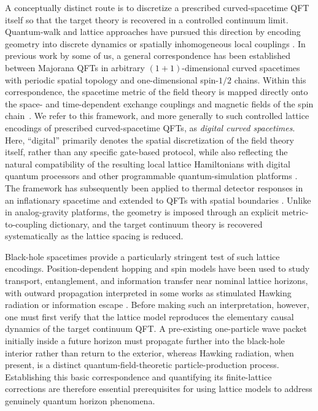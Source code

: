 \documentclass[reprint,amsmath,amssymb,aps,prb,showkeys,superscriptaddress]{revtex4-2}
\begin{document}
A conceptually distinct route is to discretize a prescribed curved-spacetime QFT itself so that the target theory is recovered in a controlled continuum limit. Quantum-walk and lattice approaches have pursued this direction by encoding geometry into discrete dynamics or spatially inhomogeneous local couplings \cite{DiMolfetta2013,Yang2020,LewisVidal2020}. In previous work by some of us, a general correspondence has been established between Majorana QFTs in arbitrary $(1+1)$-dimensional curved spacetimes with periodic spatial topology and one-dimensional spin-$1/2$ chains. Within this correspondence, the spacetime metric of the field theory is mapped directly onto the space- and time-dependent exchange couplings and magnetic fields of the spin chain~\cite{Kinoshita2025}. We refer to this framework, and more generally to such controlled lattice encodings of prescribed curved-spacetime QFTs, as \emph{digital curved spacetimes}. Here, ``digital'' primarily denotes the spatial discretization of the field theory itself, rather than any specific gate-based protocol, while also reflecting the natural compatibility of the resulting local lattice Hamiltonians with digital quantum processors and other programmable quantum-simulation platforms \cite{Altman2021}. The framework has subsequently been applied to thermal detector responses in an inflationary spacetime and extended to QFTs with spatial boundaries \cite{KinoshitaInflation2025,KinoshitaBoundary2026}. Unlike in analog-gravity platforms, the geometry is imposed through an explicit metric-to-coupling dictionary, and the target continuum theory is recovered systematically as the lattice spacing is reduced.

Black-hole spacetimes provide a particularly stringent test of such lattice encodings. Position-dependent hopping and spin models have been used to study transport, entanglement, and information transfer near nominal lattice horizons, with outward propagation interpreted in some works as stimulated Hawking radiation or information escape \cite{Yang2020,Shi2023,Benhemou2023,Liu2026}. Before making such an interpretation, however, one must first verify that the lattice model reproduces the elementary causal dynamics of the target continuum QFT. A pre-existing one-particle wave packet initially inside a future horizon must propagate further into the black-hole interior rather than return to the exterior, whereas Hawking radiation, when present, is a distinct quantum-field-theoretic particle-production process. Establishing this basic correspondence and quantifying its finite-lattice corrections are therefore essential prerequisites for using lattice models to address genuinely quantum horizon phenomena.
\end{document}
